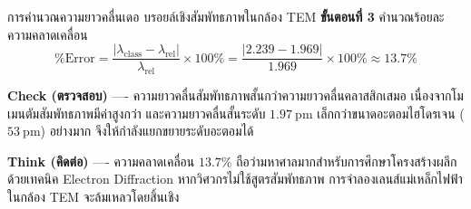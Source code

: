 \begin{psctbox}{การคำนวณความยาวคลื่นเดอ บรอยล์เชิงสัมพัทธภาพในกล้อง TEM}
\textbf{ขั้นตอนที่ 3} คำนวณร้อยละความคลาดเคลื่อน
\begin{equation*}
\% \text{Error} = \frac{|\lambda_{\text{class}} - \lambda_{\text{rel}}|}{\lambda_{\text{rel}}} \times 100\% = \frac{|2.239 - 1.969|}{1.969} \times 100\% \approx 13.7\%
\end{equation*}

\textbf{Check (ตรวจสอบ)} ---- ความยาวคลื่นสัมพัทธภาพสั้นกว่าความยาวคลื่นคลาสสิกเสมอ เนื่องจากโมเมนตัมสัมพัทธภาพมีค่าสูงกว่า และความยาวคลื่นสั้นระดับ $1.97~\text{pm}$ เล็กกว่าขนาดอะตอมไฮโดรเจน ($53~\text{pm}$) อย่างมาก จึงให้กำลังแยกขยายระดับอะตอมได้

\textbf{Think (คิดต่อ)} ---- ความคลาดเคลื่อน $13.7\%$ ถือว่ามหาศาลมากสำหรับการศึกษาโครงสร้างผลึกด้วยเทคนิค Electron Diffraction หากวิศวกรไม่ใช้สูตรสัมพัทธภาพ การจำลองเลนส์แม่เหล็กไฟฟ้าในกล้อง TEM จะล้มเหลวโดยสิ้นเชิง
\end{psctbox}

